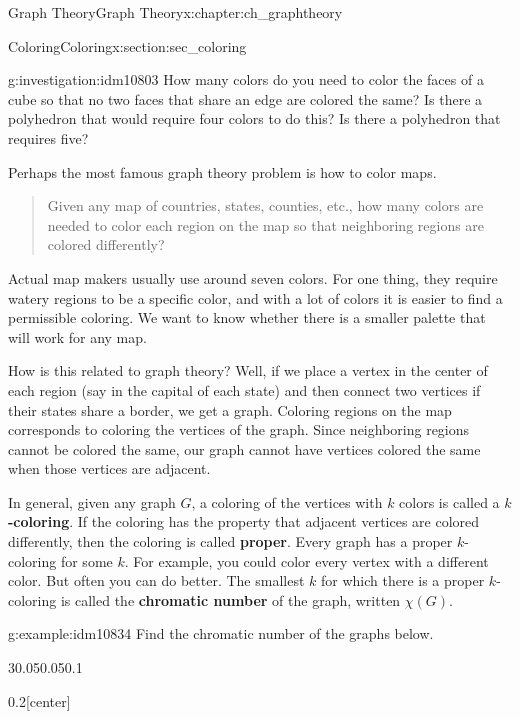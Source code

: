 \documentclass[oneside,10pt,]{book}
\newcommand{\terminology}[1]{\textbf{#1}}
\numberwithin{equation}{chapter}
\newcommand{\vtx}[2]{node[fill,circle,inner sep=0pt, minimum size=4pt,label=#1:#2]{}}
\renewcommand{\v}{\vtx{above}{}}
\begin{document}
\begin{chapterptx}{Graph Theory}{}{Graph Theory}{}{}{x:chapter:ch_graphtheory}
\begin{sectionptx}{Coloring}{}{Coloring}{}{}{x:section:sec_coloring}
\begin{introduction}{}
\begin{investigation}{}{g:investigation:idm10803}
How many colors do you need to color the faces of a cube so that no two faces that share an edge are colored the same?  Is there a polyhedron that would require four colors to do this?  Is there a polyhedron that requires five?%
\end{investigation}
Perhaps the most famous graph theory problem is how to color maps.%
\begin{quote}%
Given any map of countries, states, counties, etc., how many colors are needed to color each region on the map so that neighboring regions are colored differently?%
\end{quote}
Actual map makers usually use around seven colors. For one thing, they require watery regions to be a specific color, and with a lot of colors it is easier to find a permissible coloring. We want to know whether there is a smaller palette that will work for any map.%
\par
How is this related to graph theory? Well, if we place a vertex in the center of each region (say in the capital of each state) and then connect two vertices if their states share a border, we get a graph. Coloring regions on the map corresponds to coloring the vertices of the graph. Since neighboring regions cannot be colored the same, our graph cannot have vertices colored the same when those vertices are adjacent.%
\par
In general, given any graph \(G\), a coloring of the vertices with \(k\) colors is called a \terminology{\(k\)-coloring}. If the coloring has the property that adjacent vertices are colored differently, then the coloring is called \terminology{proper}. Every graph has a proper \(k\)-coloring for some \(k\). For example, you could color every vertex with a different color. But often you can do better. The smallest \(k\) for which there is a proper \(k\)-coloring is called the \terminology{chromatic number} of the graph, written \(\chi(G)\)\label{g:notation:idm10830}.%
\begin{example}{}{g:example:idm10834}%
Find the chromatic number of the graphs below.%
\begin{sidebyside}{3}{0.05}{0.05}{0.1}%
\begin{sbspanel}{0.2}[center]%
\resizebox{\linewidth}{!}{%
\begin{tikzpicture}
	      \foreach \x in {0,...,6}
	      \draw  (\x*60:1) \v -- (\x*60+60:1) -- (\x*60+180:1) -- cycle;
	    \end{tikzpicture}
}%
\end{sbspanel}%

\end{sidebyside}
\end{example}
\end{introduction}
\end{sectionptx}
\end{chapterptx}
\end{document}

